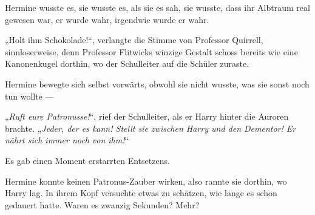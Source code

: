 Hermine wusste es, sie wusste es, als sie es sah, sie wusste, dass ihr Albtraum real gewesen war, er wurde wahr, irgendwie wurde er wahr.

„Holt ihm Schokolade!“, verlangte die Stimme von Professor Quirrell, sinnloserweise, denn Professor Flitwicks winzige Gestalt schoss bereits wie eine Kanonenkugel dorthin, wo der Schulleiter auf die Schüler zuraste.

Hermine bewegte sich selbst vorwärts, obwohl sie nicht wusste, was sie sonst noch tun wollte —

„\emph{Ruft eure Patronusse!}“, rief der Schulleiter, als er Harry hinter die Auroren brachte.
„\emph{Jeder, der es kann! Stellt sie zwischen Harry und den Dementor! Er nährt sich immer noch von ihm!}“

Es gab einen Moment erstarrten Entsetzens.


Hermine konnte keinen Patronus-Zauber wirken, also rannte sie dorthin, wo Harry lag. In ihrem Kopf versuchte etwas zu schätzen, wie lange es schon gedauert hatte. Waren es zwanzig Sekunden? Mehr?

